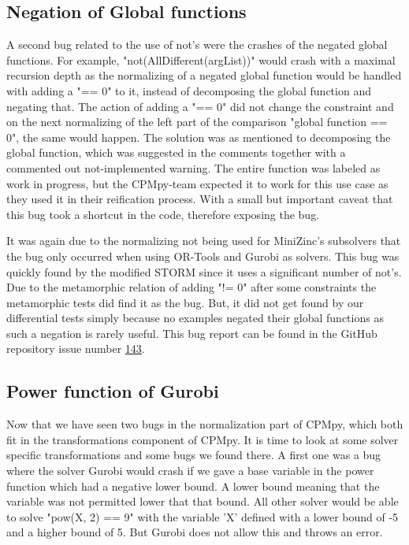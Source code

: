 \subsection{Negation of Global functions}
\label{res:bug:NegatedGlobal}
A second bug related to the use of not's were the crashes of the negated global functions. For example, "not(AllDifferent(argList))" would crash with a maximal recursion depth as the normalizing of a negated global function would be handled with adding a "== 0" to it, instead of decomposing the global function and negating that. The action of adding a "== 0" did not change the constraint and on the next normalizing of the left part of the comparison "global function == 0", the same would happen. The solution was as mentioned to decomposing the global function, which was suggested in the comments together with a commented out not-implemented warning. The entire function was labeled as work in progress, but the CPMpy-team expected it to work for this use case as they used it in their reification process. With a small but important caveat that this bug took a shortcut in the code, therefore exposing the bug. 

It was again due to the normalizing not being used for MiniZinc's subsolvers that the bug only occurred when using OR-Tools and Gurobi as solvers. This bug was quickly found by the modified STORM since it uses a significant number of not's. Due to the metamorphic relation of adding "!= 0" after some constraints the metamorphic tests did find it as the bug. But, it did not get found by our differential tests simply because no examples negated their global functions as such a negation is rarely useful. This bug report can be found in the GitHub repository issue number  \href{https://github.com/CPMpy/cpmpy/issues/143}{143}.

\subsection{Power function of Gurobi}
\label{res:bug:Power}
Now that we have seen two bugs in the normalization part of CPMpy, which both fit in the transformations component of CPMpy. It is time to look at some solver specific transformations and some bugs we found there. A first one was a bug where the solver Gurobi would crash if we gave a base variable in the power function which had a negative lower bound. A lower bound meaning that the variable was not permitted lower that that bound. All other solver would be able to solve "pow(X, 2) == 9" with the variable 'X' defined with a lower bound of -5 and a higher bound of 5. But Gurobi does not allow this and throws an error.

